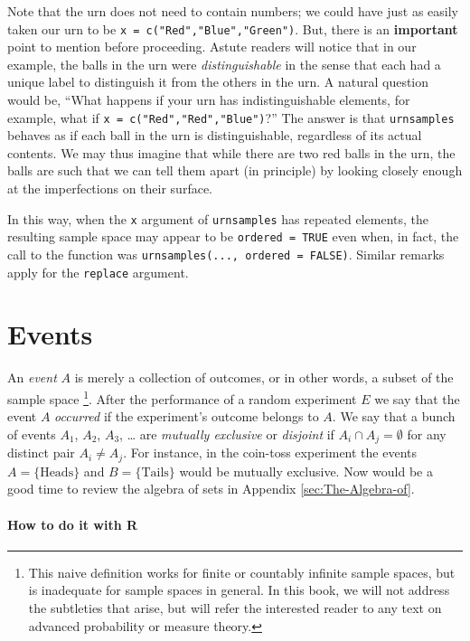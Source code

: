 \documentclass[captions=tableheading]{scrbook}
\begin{document}
Note that the urn does not need to contain numbers; we could have just as easily taken our urn to be \texttt{x = c("Red","Blue","Green")}. But, there is an \textbf{important} point to mention before proceeding. Astute readers will notice that in our example, the balls in the urn were \textit{distinguishable} in the sense that each had a unique label to distinguish it from the others in the urn. A natural question would be, ``What happens if your urn has indistinguishable elements, for example, what if \texttt{x = c("Red","Red","Blue")}?'' The answer is that \texttt{urnsamples} behaves as if each ball in the urn is distinguishable, regardless of its actual contents. We may thus imagine that while there are two red balls in the urn, the balls are such that we can tell them apart (in principle) by looking closely enough at the imperfections on their
surface.

In this way, when the \texttt{x} argument of \texttt{urnsamples} has repeated elements, the resulting sample space may appear to be \texttt{ordered = TRUE} even when, in fact, the call to the function was \texttt{urnsamples(..., ordered = FALSE)}. Similar remarks apply for the \texttt{replace} argument. 
\section{Events}
\label{sec-4-2}

\label{sec:Events}

An \emph{event} \(A\) is merely a collection of outcomes, or in other words, a subset of the sample space
\footnote{This naive definition works for finite or countably infinite sample spaces, but is inadequate for sample spaces in general. In this book, we will not address the subtleties that arise, but will refer the interested reader to any text on advanced probability or measure theory.}.
After the performance of a random experiment \(E\) we say that the event \(A\) \emph{occurred} if the experiment's outcome belongs to \(A\). We say that a bunch of events \(A_{1}\), \(A_{2}\), \(A_{3}\), \ldots{} are \emph{mutually exclusive} or \emph{disjoint} if \(A_{i}\cap A_{j}=\emptyset\) for any distinct pair \(A_{i}\neq A_{j}\). For instance, in the coin-toss experiment the events \( A = \{ \mbox{Heads} \}\) and \( B = \{ \mbox{Tails} \} \) would be mutually exclusive. Now would be a good time to review the algebra of sets in Appendix \ref{sec:The-Algebra-of}.

\paragraph*{How to do it with \textsf{R}}
\end{document}
